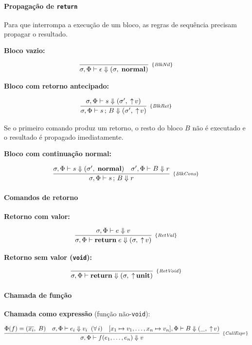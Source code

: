 \paragraph{Propagação de \texttt{return}}

Para que  interrompa a execução de um bloco, as
regras de sequência precisam propagar o resultado.

\textbf{Bloco vazio:}

\[
  \infer[_{\{\mathit{BlkNil}\}}]
  {\sigma,\Phi \vdash \epsilon \Downarrow (\sigma,\; \mathbf{normal})}
  {}
\]

\textbf{Bloco com retorno antecipado:}

\[
  \infer[_{\{\mathit{BlkRet}\}}]
  {\sigma,\Phi \vdash s\,;\,B \Downarrow (\sigma',\; {\uparrow}\,v)}
  {\sigma,\Phi \vdash s \Downarrow (\sigma',\; {\uparrow}\,v)}
\]

Se o primeiro comando produz um retorno, o resto do bloco \(B\) não é
executado e o resultado é propagado imediatamente.

\textbf{Bloco com continuação normal:}

\[
  \infer[_{\{\mathit{BlkCons}\}}]
  {\sigma,\Phi \vdash s\,;\,B \Downarrow r}
  {\sigma,\Phi \vdash s \Downarrow (\sigma',\; \mathbf{normal})
  \quad \sigma',\Phi \vdash B \Downarrow r}
\]

\paragraph{Comandos de retorno}

\textbf{Retorno com valor:}

\[
  \infer[_{\{\mathit{RetVal}\}}]
  {\sigma,\Phi \vdash \mathbf{return}\; e \Downarrow (\sigma,\; {\uparrow}\,v)}
  {\sigma,\Phi \vdash e \Downarrow v}
\]

\textbf{Retorno sem valor (\texttt{void}):}

\[
  \infer[_{\{\mathit{RetVoid}\}}]
  {\sigma,\Phi \vdash \mathbf{return} \Downarrow (\sigma,\;
  {\uparrow}\,\mathbf{unit})}
  {}
\]

\paragraph{Chamada de função}

\textbf{Chamada como expressão} (função não-\texttt{void}):

\[
  \infer[_{\{\mathit{CallExpr}\}}]
  {\sigma,\Phi \vdash f(e_1,\ldots,e_n) \Downarrow v}
  {
    \Phi(f) = (\overline{x_i},\; B)
    \quad
    \sigma,\Phi \vdash e_i \Downarrow v_i \;\;(\forall\, i)
    \quad
    [x_1 \mapsto v_1,\ldots,x_n \mapsto v_n],\Phi \vdash B
    \Downarrow (\_,\; {\uparrow}\,v)
  }
\]

